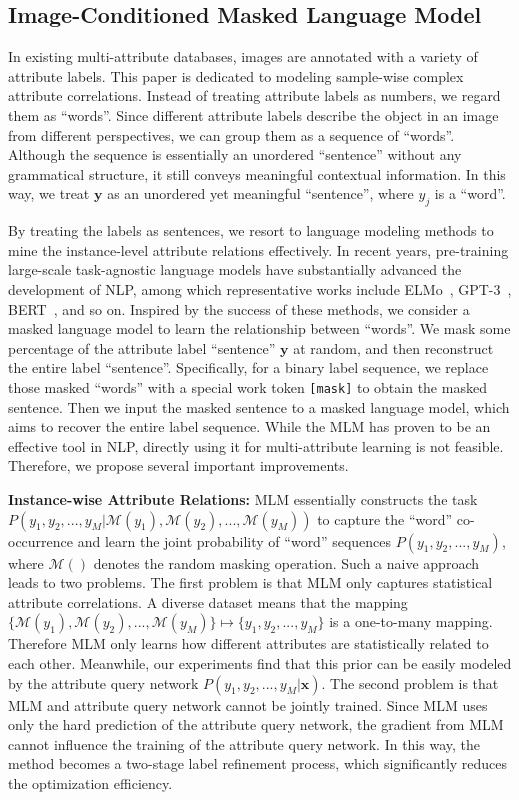 \documentclass[runningheads]{llncs}
\begin{document}
\subsection{Image-Conditioned Masked Language Model}
In existing multi-attribute databases, images are annotated with a variety of attribute labels. This paper is dedicated to modeling sample-wise complex attribute correlations.
Instead of treating attribute labels as numbers, we regard them as ``words''. Since different attribute labels describe the object in an image from different perspectives, we can group them as a sequence of ``words''. Although the sequence is essentially an unordered ``sentence'' without any grammatical structure, it still conveys meaningful contextual information. In this way, we treat $\bm{y}$ as an unordered yet meaningful ``sentence'', where $y_{j}$ is a ``word''.

By treating the labels as sentences, we resort to language modeling methods to mine the instance-level attribute relations effectively. In recent years, pre-training large-scale task-agnostic language models have substantially advanced the development of NLP, among which representative works include ELMo~\cite{peters2018deep}, GPT-3~\cite{brown2020language}, BERT~\cite{devlin2018bert}, and so on. Inspired by the success of these methods, we consider a masked language model to learn the relationship between ``words''. We mask some percentage of the attribute label ``sentence'' $\bm{y}$ at random, and then reconstruct the entire label ``sentence''.  Specifically, for a binary label sequence, we replace those masked ``words'' with a special work token \texttt{[mask]} to obtain the masked sentence. Then we input the masked sentence to a masked language model, which aims to recover the entire label sequence. While the MLM has proven to be an effective tool in NLP, directly using it for multi-attribute learning is not feasible. Therefore, we propose several important improvements.


\textbf{Instance-wise Attribute Relations:} MLM essentially constructs the task $P(y_1,y_2,..., y_M|\mathcal{M}(y_1),\mathcal{M}(y_2),...,\mathcal{M}(y_M))$ to capture the ``word'' co-occurrence and learn the joint probability of ``word'' sequences $P(y_1,y_2,..., y_M)$, where $\mathcal{M}()$ denotes the random masking operation. Such a naive approach leads to two problems. The first problem is that MLM only captures statistical attribute correlations. A diverse dataset means that the mapping $\{ \mathcal{M}(y_1),\mathcal{M}(y_2),...,\mathcal{M}(y_M)\} \mapsto \{y_1,y_2,..., y_M\}$ is a one-to-many mapping. Therefore MLM only learns how different attributes are statistically related to each other. Meanwhile, our experiments find that this prior can be easily modeled by the attribute query network $P(y_1,y_2,..., y_M |\bm{x})$. The second problem is that MLM and attribute query network cannot be jointly trained. Since MLM uses only the hard prediction of the attribute query network, the gradient from MLM cannot influence the training of the attribute query network. In this way, the method becomes a two-stage label refinement process, which significantly reduces the optimization efficiency.
\end{document}
